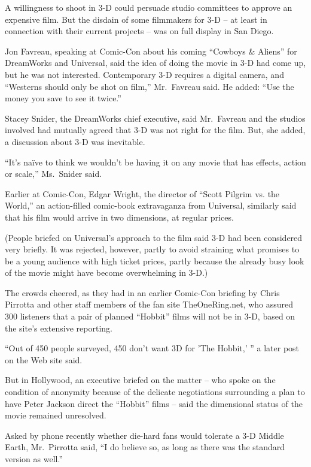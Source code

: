 ﻿\documentclass[12pt]{article}
\begin{document}
A willingness to shoot in 3-D could persuade studio committees to approve an expensive film. But the
disdain of some filmmakers for 3-D -- at least in connection with their current projects -- was on
full display in San Diego.

Jon Favreau, speaking at Comic-Con about his coming ``Cowboys \& Aliens'' for DreamWorks and
Universal, said the idea of doing the movie in 3-D had come up, but he was not interested.
Contemporary 3-D requires a digital camera, and ``Westerns should only be shot on film,''
Mr.~Favreau said. He added: ``Use the money you save to see it twice.''

Stacey Snider, the DreamWorks chief executive, said Mr.~Favreau and the studios involved had
mutually agreed that 3-D was not right for the film. But, she added, a discussion about 3-D was
inevitable.

``It's na\"ive to think we wouldn't be having it on any movie that has effects, action or scale,''
Ms.~Snider said.

Earlier at Comic-Con, Edgar Wright, the director of ``Scott Pilgrim vs. the World,'' an
action-filled comic-book extravaganza from Universal, similarly said that his film would arrive in
two dimensions, at regular prices.

(People briefed on Universal's approach to the film said 3-D had been considered very briefly. It
was rejected, however, partly to avoid straining what promises to be a young audience with high
ticket prices, partly because the already busy look of the movie might have become overwhelming in
3-D.)

The crowds cheered, as they had in an earlier Comic-Con briefing by Chris Pirrotta and other staff
members of the fan site TheOneRing.net, who assured 300 listeners that a pair of planned ``Hobbit''
films will not be in 3-D, based on the site's extensive reporting.

``Out of 450 people surveyed, 450 don't want 3D for 'The Hobbit,' '' a later post on the Web site
said.

But in Hollywood, an executive briefed on the matter -- who spoke on the condition of anonymity
because of the delicate negotiations surrounding a plan to have Peter Jackson direct the ``Hobbit''
films -- said the dimensional status of the movie remained unresolved.

Asked by phone recently whether die-hard fans would tolerate a 3-D Middle Earth, Mr.~Pirrotta said,
``I do believe so, as long as there was the standard version as well.''
\end{document}
